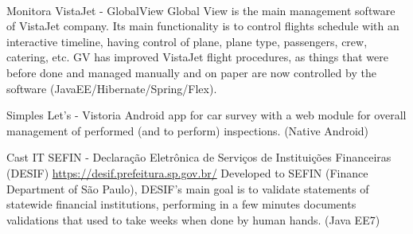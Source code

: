 \documentclass[]{friggeri-cv}
\begin{document}
\\
\begin{entrylist}
  \entry
    {Monitora}
    {VistaJet - GlobalView }
    {\href{}{}}
    {Global View is the main management software of VistaJet company. Its main functionality is to control flights schedule with an interactive timeline, having control of plane, plane type, passengers, crew, catering, etc. GV has improved VistaJet flight procedures, as things that were before done and managed manually and on paper are now controlled by the software (JavaEE/Hibernate/Spring/Flex).}   

  \entry
    {Simples}
    {Let's - Vistoria }
    {\href{}{}}
    {Android app for car survey with a web module for overall management of performed (and to perform) inspections. (Native Android)}
    
  \entry
    {Cast IT}
    {SEFIN - Declaração Eletrônica de Serviços de Instituições Financeiras (DESIF) }
    {\href{}{https://desif.prefeitura.sp.gov.br/}}
    {Developed to SEFIN (Finance Department of São Paulo), DESIF's main goal is to validate statements of statewide financial institutions, performing in a few minutes documents validations that used to take weeks when done by human hands. (Java EE7) }
\end{entrylist}
\end{document}
